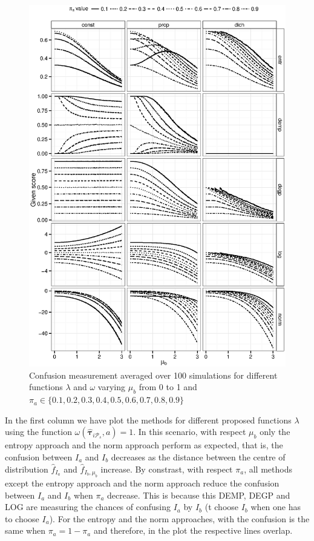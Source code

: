 \documentclass[10pt, a4paper]{article}
\newcommand{\m}[1]{\boldsymbol{#1}}
\begin{document}
\begin{spacing}{1.9}
\begin{figure}[!t]
\centering
\includegraphics[scale=.5]{fig01all.eps}
\caption{Confusion measurement averaged over 100 simulations for different functions $\lambda$ and $\omega$ varying $\mu_b$ from 0 to 1 and $\pi_a \in \{0.1, 0.2, 0.3, 0.4, 0.5, 0.6, 0.7, 0.8, 0.9\}$ }
\label{fig:mu_varying}
\end{figure}

In the first column we have plot the methods for different proposed functions $\lambda$ using the function $\omega(\hat{\m \tau}_{i \mathcal{P}_s}, a) = 1$. In this scenario, with respect $\mu_b$ only the entropy approach and the norm approach perform as expected, that is, the confusion between $I_a$ and $I_b$ decreases as the distance between the centre of distribution $\hat{f}_{I_a}$ and $\hat{f}_{I_b, \mu_b}$ increase. By constrast, with respect $\pi_a$, all methods except the entropy approach and the norm approach reduce the confusion between $I_a$ and $I_b$ when $\pi_a$ decrease. This is because this DEMP, DEGP and LOG are measuring the chances of confusing $I_a$ by $I_b$ (t choose $I_b$ when one has to choose $I_a$). For the  entropy and the norm  approaches, with the confusion is the same when $\pi_a = 1- \pi_a$ and therefore, in the plot the respective lines overlap.




\end{spacing}
\end{document}
